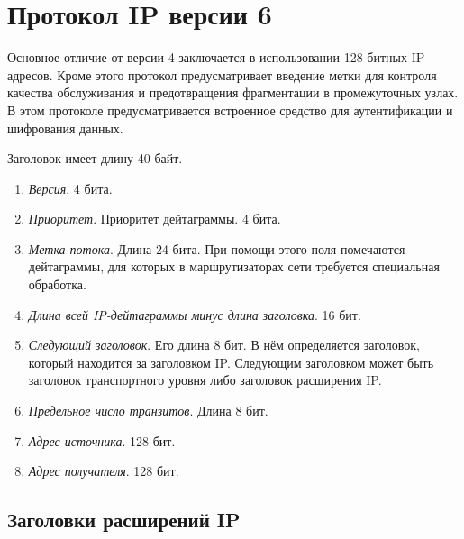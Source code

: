 \documentclass[12pt, russian, oneside, article]{ncc}
\begin{document}
\section{Протокол IP версии 6}
\label{sec-3}


Основное отличие от версии 4 заключается в использовании 128-битных IP-адресов. Кроме этого протокол предусматривает введение метки для контроля качества обслуживания и предотвращения фрагментации в промежуточных узлах. В этом протоколе предусматривается встроенное средство для аутентификации и шифрования данных.

Заголовок имеет длину 40 байт.
\begin{enumerate}
\item \emph{Версия}. 4 бита.
\item \emph{Приоритет}. Приоритет дейтаграммы. 4 бита.
\item \emph{Метка потока}. Длина 24  бита. При помощи этого поля помечаются дейтаграммы, для которых в маршрутизаторах сети требуется специальная обработка.
\item \emph{Длина всей IP-дейтаграммы минус длина заголовка}. 16 бит.
\item \emph{Следующий заголовок}. Его длина 8 бит. В нём определяется заголовок, который находится за заголовком IP. Следующим заголовком может быть заголовок транспортного уровня либо заголовок расширения IP.
\item \emph{Предельное число транзитов}. Длина 8 бит.
\item \emph{Адрес источника}. 128 бит.
\item \emph{Адрес получателя}. 128 бит.
\end{enumerate}
\subsection{Заголовки расширений IP}
\label{sec-3_1}
\end{document}
